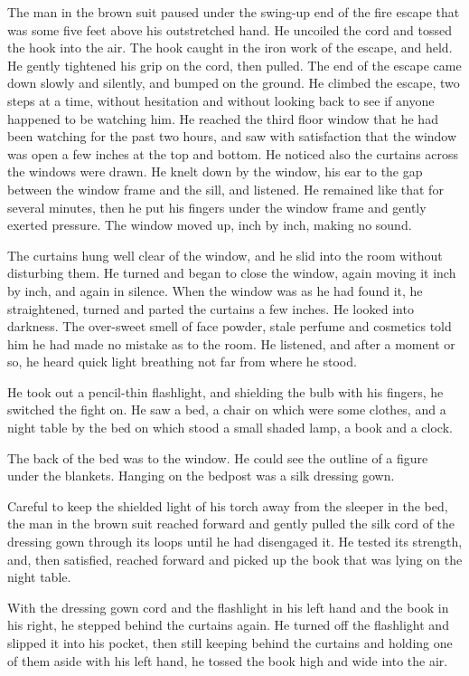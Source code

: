 \documentclass{novel}
\begin{document}
The man in the brown suit paused under the swing-up end of the fire escape that was some five feet above his outstretched hand. He uncoiled the cord and tossed the hook into the air. The hook caught in the iron work of the escape, and held. He gently tightened his grip on the cord, then pulled. The end of the escape came down slowly and silently, and bumped on the ground. He climbed the escape, two steps at a time, without hesitation and without looking back to see if anyone happened to be watching him. He reached the third floor window that he had been watching for the past two hours, and saw with satisfaction that the window was open a few inches at the top and bottom. He noticed also the curtains across the windows were drawn. He knelt down by the window, his ear to the gap between the window frame and the sill, and listened. He remained like that for several minutes, then he put his fingers under the window frame and gently exerted pressure. The window moved up, inch by inch, making no sound.

The curtains hung well clear of the window, and he slid into the room without disturbing them. He turned and began to close the window, again moving it inch by inch, and again in silence. When the window was as he had found it, he straightened, turned and parted the curtains a few inches. He looked into darkness. The over-sweet smell of face powder, stale perfume and cosmetics told him he had made no mistake as to the room. He listened, and after a moment or so, he heard quick light breathing not far from where he stood.

He took out a pencil-thin flashlight, and shielding the bulb with his fingers, he switched the fight on. He saw a bed, a chair on which were some clothes, and a night table by the bed on which stood a small shaded lamp, a book and a clock.

The back of the bed was to the window. He could see the outline of a figure under the blankets. Hanging on the bedpost was a silk dressing gown.

Careful to keep the shielded light of his torch away from the sleeper in the bed, the man in the brown suit reached forward and gently pulled the silk cord of the dressing gown through its loops until he had disengaged it. He tested its strength, and, then satisfied, reached forward and picked up the book that was lying on the night table.

With the dressing gown cord and the flashlight in his left hand and the book in his right, he stepped behind the curtains again. He turned off the flashlight and slipped it into his pocket, then still keeping behind the curtains and holding one of them aside with his left hand, he tossed the book high and wide into the air.
\end{document}
